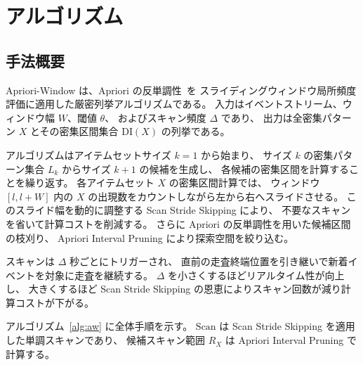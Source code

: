 \section{アルゴリズム}

\subsection{手法概要}

Apriori-Window は、Apriori の反単調性~\cite{agrawal1994fast}を
スライディングウィンドウ局所頻度評価に適用した厳密列挙アルゴリズムである。
入力はイベントストリーム、ウィンドウ幅 $W$、閾値 $\theta$、
およびスキャン頻度 $\Delta$ であり、
出力は全密集パターン $X$ とその密集区間集合 $\mathrm{DI}(X)$ の列挙である。

アルゴリズムはアイテムセットサイズ $k = 1$ から始まり、
サイズ $k$ の密集パターン集合 $L_k$ からサイズ $k{+}1$ の候補を生成し、
各候補の密集区間を計算することを繰り返す。
各アイテムセット $X$ の密集区間計算では、
ウィンドウ $[l, l{+}W]$ 内の $X$ の出現数をカウントしながら左から右へスライドさせる。
このスライド幅を動的に調整する Scan Stride Skipping により、
不要なスキャンを省いて計算コストを削減する。
さらに Apriori の反単調性を用いた候補区間の枝刈り、
Apriori Interval Pruning により探索空間を絞り込む。

スキャンは $\Delta$ 秒ごとにトリガーされ、
直前の走査終端位置を引き継いで新着イベントを対象に走査を継続する。
$\Delta$ を小さくするほどリアルタイム性が向上し、
大きくするほど Scan Stride Skipping の恩恵によりスキャン回数が減り計算コストが下がる。

アルゴリズム~\ref{alg:aw} に全体手順を示す。
$\mathrm{Scan}$ は Scan Stride Skipping を適用した単調スキャンであり、
候補スキャン範囲 $R_X$ は Apriori Interval Pruning で計算する。

